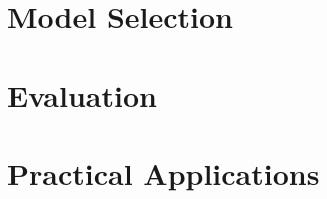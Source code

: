 \section{Model Selection}
\label{section:model_selection}

\section{Evaluation}
\label{section:evaluation}

\section{Practical Applications}
\label{section:practical_applications}
